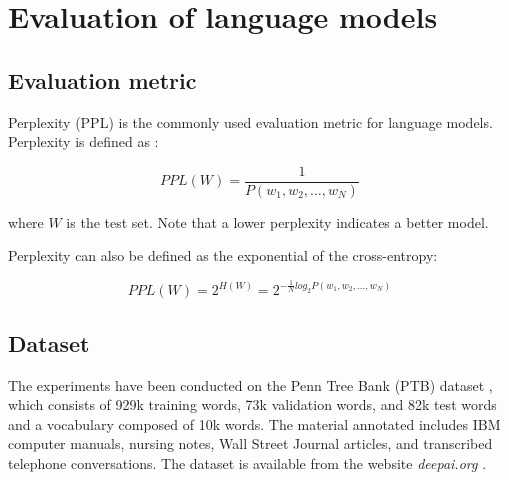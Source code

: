 
\section{Evaluation of language models}

\subsection{Evaluation metric}

Perplexity (PPL) is the commonly used evaluation metric for language models. 
Perplexity is defined as \cite{PPL}:

\begin{equation}
    PPL(W) = \frac{1}{P(w_1, w_2, \dots, w_N)}
\end{equation}

where $W$ is the test set. Note that a lower perplexity indicates a better model.

Perplexity can also be defined as the exponential of the cross-entropy:

\begin{equation}
    PPL(W) = 2^{H(W)} = 2^{-\frac{1}{N} log_2 P(w_1, w_2, \dots, w_N)}
\end{equation}


\subsection{Dataset}

The experiments have been conducted on the Penn Tree Bank (PTB) dataset 
\cite{PTB}, 
which consists of 929k training words, 73k validation words, and 82k test 
words and a vocabulary composed of 10k words. The material annotated includes 
IBM computer manuals, nursing notes, Wall Street Journal articles, and 
transcribed telephone conversations. The dataset is available from the website 
\textit{deepai.org} \cite{PTB_download}.
